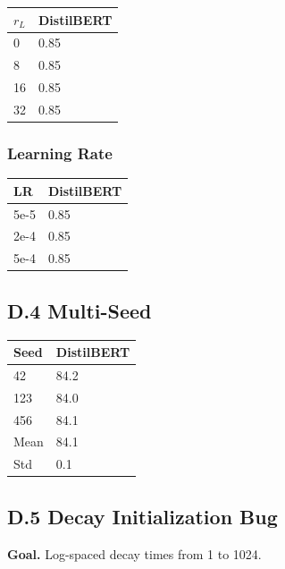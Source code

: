 \begin{table}[H]
\centering
\small
\begin{tabular}{ll}
\toprule
\textbf{$r_L$} & \textbf{DistilBERT} \\
\midrule
0 & 0.85 \\
8 & 0.85 \\
16 & 0.85 \\
32 & 0.85 \\
\bottomrule
\end{tabular}
\end{table}

\subsubsection{Learning Rate}

\begin{table}[H]
\centering
\small
\begin{tabular}{ll}
\toprule
\textbf{LR} & \textbf{DistilBERT} \\
\midrule
5e-5 & 0.85 \\
2e-4 & 0.85 \\
5e-4 & 0.85 \\
\bottomrule
\end{tabular}
\end{table}

\subsection{D.4 Multi-Seed}

\begin{table}[H]
\centering
\small
\begin{tabular}{ll}
\toprule
\textbf{Seed} & \textbf{DistilBERT} \\
\midrule
42 & 84.2 \\
123 & 84.0 \\
456 & 84.1 \\
Mean & 84.1 \\
Std & 0.1 \\
\bottomrule
\end{tabular}
\end{table}

\subsection{D.5 Decay Initialization Bug}

\textbf{Goal.} Log-spaced decay times from 1 to 1024.

